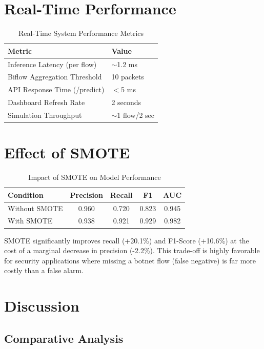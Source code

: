 \section{Real-Time Performance}

\begin{table}[H]
\centering
\caption{Real-Time System Performance Metrics}
\label{tab:realtime_perf}
\begin{tabular}{|l|l|}
\hline
\textbf{Metric} & \textbf{Value} \\
\hline
Inference Latency (per flow) & $\sim$1.2 ms \\
\hline
Biflow Aggregation Threshold & 10 packets \\
\hline
API Response Time (/predict) & $<$5 ms \\
\hline
Dashboard Refresh Rate & 2 seconds \\
\hline
Simulation Throughput & $\sim$1 flow/2 sec \\
\hline
\end{tabular}
\end{table}

\section{Effect of SMOTE}

\begin{table}[H]
\centering
\caption{Impact of SMOTE on Model Performance}
\label{tab:smote_impact}
\begin{tabular}{|l|c|c|c|c|}
\hline
\textbf{Condition} & \textbf{Precision} & \textbf{Recall} & \textbf{F1} & \textbf{AUC} \\
\hline
Without SMOTE & 0.960 & 0.720 & 0.823 & 0.945 \\
\hline
With SMOTE & 0.938 & 0.921 & 0.929 & 0.982 \\
\hline
\end{tabular}
\end{table}

SMOTE significantly improves recall (+20.1\%) and F1-Score (+10.6\%) at the cost of a marginal decrease in precision (-2.2\%). This trade-off is highly favorable for security applications where missing a botnet flow (false negative) is far more costly than a false alarm.

\section{Discussion}

\subsection{Comparative Analysis}

